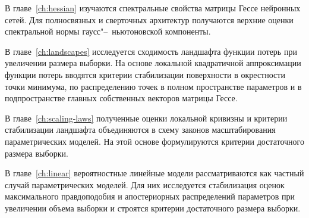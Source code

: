 В главе~\ref{ch:hessian} изучаются спектральные свойства матрицы Гессе нейронных сетей. Для полносвязных и сверточных архитектур получаются верхние оценки спектральной нормы гаусс"--~ньютоновской компоненты.

В главе~\ref{ch:landscapes} исследуется сходимость ландшафта функции потерь при увеличении размера выборки. На основе локальной квадратичной аппроксимации функции потерь вводятся критерии стабилизации поверхности в окрестности точки минимума, по распределению точек в полном пространстве параметров и в подпространстве главных собственных векторов матрицы Гессе.

В главе~\ref{ch:scaling-laws} полученные оценки локальной кривизны и критерии стабилизации ландшафта объединяются в схему законов масштабирования параметрических моделей. На этой основе формулируются критерии достаточного размера выборки.

В главе~\ref{ch:linear} вероятностные линейные модели рассматриваются как частный случай параметрических моделей. Для них исследуется стабилизация оценок максимального правдоподобия и апостериорных распределений параметров при увеличении объема выборки и строятся критерии достаточного размера выборки.